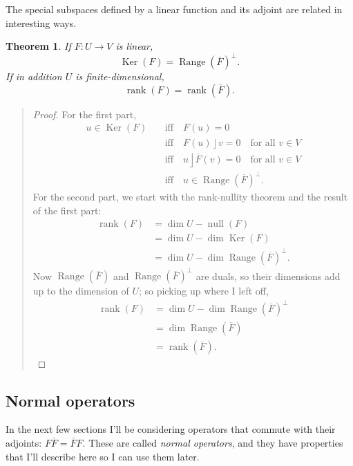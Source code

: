 \documentclass{utarticle}
\DeclareMathOperator{\lin}{\rfloor}
\newcommand{\Ker}{\operatorname{Ker}}
\newcommand{\Range}{\operatorname{Range}}
\newcommand{\rank}{\operatorname{rank}}
\newcommand{\nullity}{\operatorname{null}}
\newcommand{\adj}[1]{\ensuremath{\overline{#1}}}
\newtheorem{thm}{Theorem}
\newcommand{\bp}{\begin{quotation} \begin{proof}}
\newcommand{\ep}{\end{proof} \end{quotation}}
\begin{document}
The special subspaces defined by a linear function and its adjoint are related in interesting ways.
\begin{thm}
If $F: U \rightarrow V$ is linear,
\begin{equation} \Ker(F) = \Range(\adj{F})^\perp. \end{equation}
If in addition $U$ is finite-dimensional,
\begin{equation} \rank(F) = \rank(\adj{F}). \end{equation}
\label{adjkerran}
\end{thm}
\bp
For the first part,
\begin{align}
u \in \Ker(F) & \quad \text{iff} \quad F(u) = 0 \nonumber \\
                      & \quad \text{iff} \quad F(u) \lin v = 0 \quad \text{for all $v \in V$} \nonumber \\
                      & \quad \text{iff} \quad u \lin \adj{F}(v) = 0 \quad \text{for all $v \in V$} \nonumber \\
                      & \quad \text{iff} \quad u \in \Range(\adj{F})^\perp. \nonumber
\end{align}
For the second part, we start with the rank-nullity theorem and the result of the first part:
\begin{align}
\rank(F) & = \dim U - \nullity(F) \nonumber \\
               & = \dim U - \dim \Ker(F) \nonumber \\
               & = \dim U - \dim \Range(\adj{F})^\perp.  \nonumber
\end{align}
Now $\Range(\adj{F})$ and $\Range(\adj{F})^\perp$ are duals, so their
dimensions add up to the dimension of $U$; so picking up where I left off,
\begin{align}
\rank(F) & = \dim U - \dim \Range(\adj{F})^\perp \nonumber \\
               & = \dim \Range(\adj{F}) \nonumber \\
               & = \rank(\adj{F}).
\end{align}
\ep
 
\subsection{Normal operators}
\label{normal}

In the next few sections I'll be considering operators that 
commute with their adjoints: $F \adj{F} = \adj{F} F$.  These are called \emph{normal 
operators}, and they have properties that I'll describe here so I can use them later.
\end{document}
